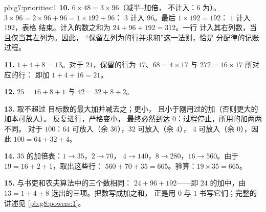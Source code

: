 \begin{solution}{pb:g7:priorities:1}
\textbf{10.} $6 \times 48 = 3 \times 96$（减半--加倍，
不计入：$6$ 为）。$3 \times 96 = 2 \times 96 + 96 =
1 \times 192 + 96$： $3$ 计入 $96$。最后
$1 \times 192 = 192$： $1$ 计入 $192$，表格
结束。计入的数之和为 $24 + 96 + 192 = 312$。一行
计入其右列数，当且仅当其左列为。因此，
“保留左列为的行并求和”这一法则，恰是
分配律的记账过程。

\textbf{11.} $1 + 4 + 8 = 13$。对于 $21$，保留的行为
$17$、$68 = 4 \times 17$ 与 $272 = 16 \times 17$ 所对应的行：
即加 $1 + 4 + 16 = 21$。

\textbf{12.} $25 = 16 + 8 + 1$ 与 $42 = 32 + 8 + 2$。

\textbf{13.} 取不超过
目标数的最大加并减去之；更小，
且小于刚用过的加（否则更大的加本可放入）。
反复进行，严格变小，
最终必然到达 $0$：过程停止，所用的加两两不同。
对于 $100$：$64$ 可放入（余 $36$），$32$ 可放入（余 $4$），
$4$ 可放入（余 $0$），因此 $100 = 64 + 32 + 4$。

\textbf{14.} $35$ 的加倍表：$1 \to 35$，$2 \to 70$，
$4 \to 140$，$8 \to 280$，$16 \to 560$。由于
$19 = 16 + 2 + 1$，取出这些行：
$560 + 70 + 35 = 665$。验算：$19 \times 35 = 665$。

\textbf{15.} 与书吏和农夫算法中的三个数相同：
$24 + 96 + 192$——即 $24$ 的加中，由
$13 = 1 + 4 + 8$ 选出的三项。把数写成加之和，
正是用 $0$ 与 $1$ 书写它们；完整的讲述见
\cref{pb:g8:powers:1}。
\end{solution}
